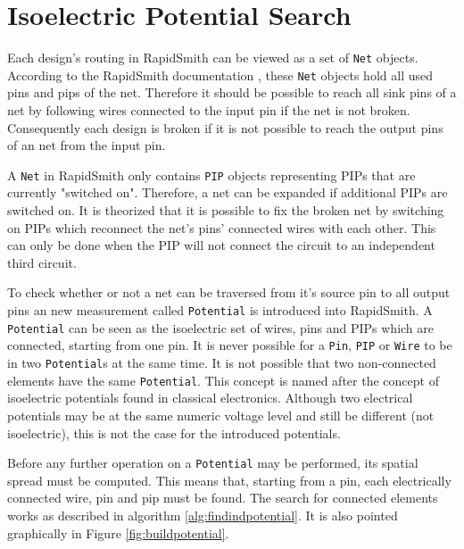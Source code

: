 \section{Isoelectric Potential Search}
\label{sec:isolectricelements}

Each design's routing in RapidSmith can be viewed as a set of \texttt{Net} objects. According to the RapidSmith documentation \cite{techDoc}, these \texttt{Net} objects hold all used pins and pips of the net.
Therefore it should be possible to reach all sink pins of a net by following wires connected to the input pin if the net is not broken.
Consequently each design is broken if it is not possible to reach the output pins of an net from the input pin.  

A \texttt{Net} in RapidSmith only contains \texttt{PIP} objects representing PIPs that are currently "switched on". Therefore, a net can be expanded if additional PIPs are switched on. 
It is theorized that it is possible to fix the broken net by switching on PIPs which reconnect the net's pins' connected wires with each other. This can only be done when the PIP will not connect the circuit to an independent third circuit.

To check whether or not a net can be traversed from it's source pin to all output pins an new measurement called \texttt{Potential} is introduced into RapidSmith.
A \texttt{Potential} can be seen as the isoelectric set of wires, pins and PIPs which are connected, starting from one pin.
It is never possible for a \texttt{Pin}, \texttt{PIP} or \texttt{Wire} to be in two \texttt{Potential}s at the same time. It is not possible that two non-connected elements have the same \texttt{Potential}. 
This concept is named after the concept of isoelectric potentials found in classical electronics. Although two electrical potentials may be at the same numeric voltage level and still be different (not isoelectric), this is not the case for the introduced potentials.

Before any further operation on a \texttt{Potential} may be performed, its spatial spread must be computed. This means that, starting from a pin, each electrically connected wire, pin and pip must be found. The search for connected elements works as described in algorithm \ref{alg:findindpotential}. It is also pointed graphically in Figure \ref{fig:buildpotential}.

